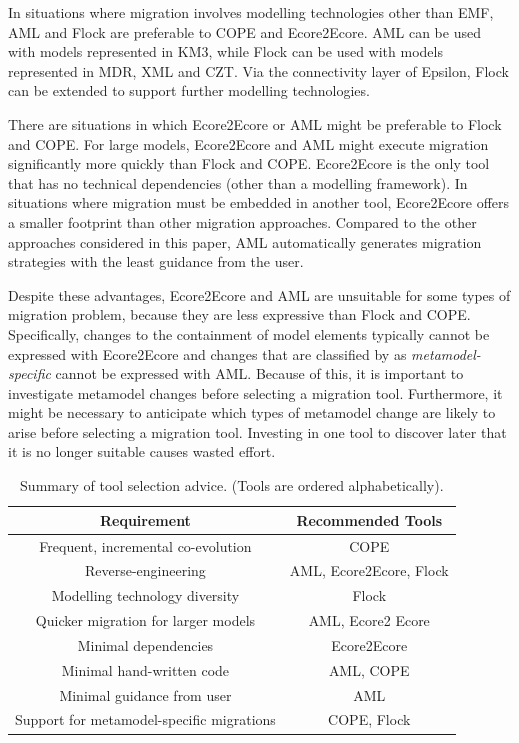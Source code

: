 In situations where migration involves modelling technologies other than EMF, AML and Flock are preferable to COPE and Ecore2Ecore. AML can be used with models represented in KM3, while Flock can be used with models represented in MDR, XML and CZT. Via the connectivity layer of Epsilon, Flock can be extended to support further modelling technologies.

There are situations in which Ecore2Ecore or AML might be preferable to Flock and COPE. For large models, Ecore2Ecore and AML might execute migration significantly more quickly than Flock and COPE. Ecore2Ecore is the only tool that has no technical dependencies (other than a modelling framework). In situations where migration must be embedded in another tool, Ecore2Ecore offers a smaller footprint than other migration approaches. Compared to the other approaches considered in this paper, AML automatically generates migration strategies with the least guidance from the user.

Despite these advantages, Ecore2Ecore and AML are unsuitable for some types of migration problem, because they are less expressive than Flock and COPE. Specifically, changes to the containment of model elements typically cannot be expressed with Ecore2Ecore and changes that are classified by %
\cite{herrmannsdoerfer08automatability} as \emph{metamodel-specific}
cannot be expressed with AML. Because of this, it is important to investigate metamodel changes before selecting a migration tool. Furthermore, it might be necessary to anticipate which types of metamodel change are likely to arise before selecting a migration tool. Investing in one tool to discover later that it is no longer suitable causes wasted effort.

\begin{table}[hbtp]
	\centering
	\caption[Summary of tool selection advice]{Summary of tool selection advice. (Tools are ordered alphabetically).}
	\label{tab:advice}
	\begin{tabular}{|c|c|}
	\hline
	\textbf{Requirement}    & \textbf{Recommended Tools} \\
	\hline
	Frequent, incremental co-evolution                & COPE \\
	\hline
	Reverse-engineering                               & AML, Ecore2Ecore, Flock \\
	\hline
	Modelling technology diversity                    & Flock \\
	\hline
	Quicker migration for larger models               & AML, Ecore2 Ecore \\
	\hline
	Minimal dependencies                              & Ecore2Ecore \\
	\hline
	Minimal hand-written code                         & AML, COPE \\
	\hline
	Minimal guidance from user                        & AML \\
	\hline
	Support for metamodel-specific migrations   & COPE, Flock \\
	\hline
	\end{tabular}
\end{table}

